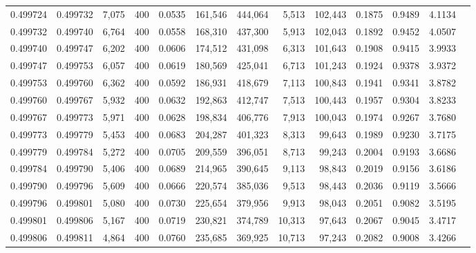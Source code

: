 \begin{tabular}{rrrrrrrrrrrrr}
0.499724 & 0.499732 &  7,075 & 400 &                                     0.0535 & 161,546 & 444,064 &   5,513 & 102,443 & 0.1875 & 0.9489 & 4.1134 \\
0.499732 & 0.499740 &  6,764 & 400 &                                     0.0558 & 168,310 & 437,300 &   5,913 & 102,043 & 0.1892 & 0.9452 & 4.0507 \\
0.499740 & 0.499747 &  6,202 & 400 &                                     0.0606 & 174,512 & 431,098 &   6,313 & 101,643 & 0.1908 & 0.9415 & 3.9933 \\
0.499747 & 0.499753 &  6,057 & 400 &                                     0.0619 & 180,569 & 425,041 &   6,713 & 101,243 & 0.1924 & 0.9378 & 3.9372 \\
0.499753 & 0.499760 &  6,362 & 400 &                                     0.0592 & 186,931 & 418,679 &   7,113 & 100,843 & 0.1941 & 0.9341 & 3.8782 \\
0.499760 & 0.499767 &  5,932 & 400 &                                     0.0632 & 192,863 & 412,747 &   7,513 & 100,443 & 0.1957 & 0.9304 & 3.8233 \\
0.499767 & 0.499773 &  5,971 & 400 &                                     0.0628 & 198,834 & 406,776 &   7,913 & 100,043 & 0.1974 & 0.9267 & 3.7680 \\
0.499773 & 0.499779 &  5,453 & 400 &                                     0.0683 & 204,287 & 401,323 &   8,313 &  99,643 & 0.1989 & 0.9230 & 3.7175 \\
0.499779 & 0.499784 &  5,272 & 400 &                                     0.0705 & 209,559 & 396,051 &   8,713 &  99,243 & 0.2004 & 0.9193 & 3.6686 \\
0.499784 & 0.499790 &  5,406 & 400 &                                     0.0689 & 214,965 & 390,645 &   9,113 &  98,843 & 0.2019 & 0.9156 & 3.6186 \\
0.499790 & 0.499796 &  5,609 & 400 &                                     0.0666 & 220,574 & 385,036 &   9,513 &  98,443 & 0.2036 & 0.9119 & 3.5666 \\
0.499796 & 0.499801 &  5,080 & 400 &                                     0.0730 & 225,654 & 379,956 &   9,913 &  98,043 & 0.2051 & 0.9082 & 3.5195 \\
0.499801 & 0.499806 &  5,167 & 400 &                                     0.0719 & 230,821 & 374,789 &  10,313 &  97,643 & 0.2067 & 0.9045 & 3.4717 \\
0.499806 & 0.499811 &  4,864 & 400 &                                     0.0760 & 235,685 & 369,925 &  10,713 &  97,243 & 0.2082 & 0.9008 & 3.4266 \\

\end{tabular}
